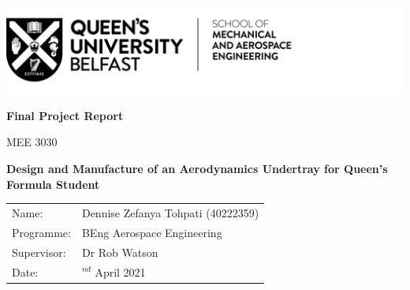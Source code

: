 \begin{titlepage}
\includegraphics[scale=1]{Figures/QUB LOGO - SMAE.png}
\centering

\vspace{4cm}
\textbf{Final Project Report}

MEE 3030

\vspace{2cm}
\textbf{\large{Design and Manufacture of an Aerodynamics Undertray for Queen's Formula Student}}


\vspace{8cm}
\begin{tabularx}{1\textwidth}{ 
   >{\raggedleft\arraybackslash}X 
   >{\raggedright\arraybackslash}X 
  }
  
Name: & \quad Dennise Zefanya Tohpati (40222359)\\
Programme: & \quad BEng Aerospace Engineering\\
Supervisor: & \quad Dr Rob Watson\\
Date: & \quad 2$^{nd}$ April 2021\\

\end{tabularx}
\end{titlepage}

